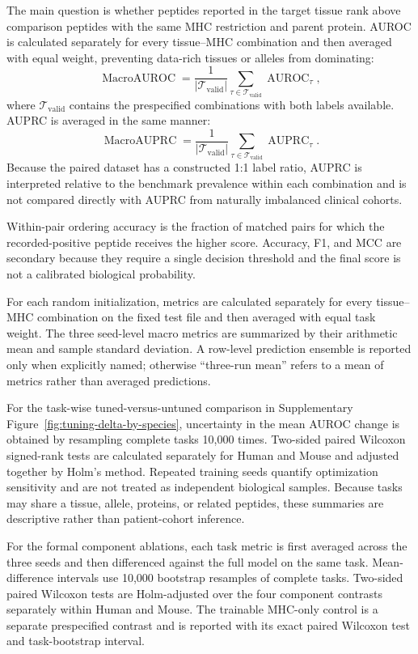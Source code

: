 The main question is whether peptides reported in the target tissue rank above comparison peptides with the same MHC restriction and parent protein. AUROC is calculated separately for every tissue--MHC combination and then averaged with equal weight, preventing data-rich tissues or alleles from dominating:
\[
\operatorname{MacroAUROC}
=
\frac{1}{|\mathcal{T}_{\mathrm{valid}}|}
\sum_{\tau\in\mathcal{T}_{\mathrm{valid}}}
\operatorname{AUROC}_{\tau},
\]
where \(\mathcal{T}_{\mathrm{valid}}\) contains the prespecified combinations with both labels available. AUPRC is averaged in the same manner:
\[
\operatorname{MacroAUPRC}
=
\frac{1}{|\mathcal{T}_{\mathrm{valid}}|}
\sum_{\tau\in\mathcal{T}_{\mathrm{valid}}}
\operatorname{AUPRC}_{\tau}.
\]
Because the paired dataset has a constructed 1:1 label ratio, AUPRC is interpreted relative to the benchmark prevalence within each combination and is not compared directly with AUPRC from naturally imbalanced clinical cohorts.

Within-pair ordering accuracy is the fraction of matched pairs for which the recorded-positive peptide receives the higher score. Accuracy, F1, and MCC are secondary because they require a single decision threshold and the final score is not a calibrated biological probability.

For each random initialization, metrics are calculated separately for every tissue--MHC combination on the fixed test file and then averaged with equal task weight. The three seed-level macro metrics are summarized by their arithmetic mean and sample standard deviation. A row-level prediction ensemble is reported only when explicitly named; otherwise ``three-run mean'' refers to a mean of metrics rather than averaged predictions.

For the task-wise tuned-versus-untuned comparison in Supplementary Figure~\ref{fig:tuning-delta-by-species}, uncertainty in the mean AUROC change is obtained by resampling complete tasks 10,000 times. Two-sided paired Wilcoxon signed-rank tests are calculated separately for Human and Mouse and adjusted together by Holm's method. Repeated training seeds quantify optimization sensitivity and are not treated as independent biological samples. Because tasks may share a tissue, allele, proteins, or related peptides, these summaries are descriptive rather than patient-cohort inference.

For the formal component ablations, each task metric is first averaged across the three seeds and then differenced against the full model on the same task. Mean-difference intervals use 10,000 bootstrap resamples of complete tasks. Two-sided paired Wilcoxon tests are Holm-adjusted over the four component contrasts separately within Human and Mouse. The trainable MHC-only control is a separate prespecified contrast and is reported with its exact paired Wilcoxon test and task-bootstrap interval.

